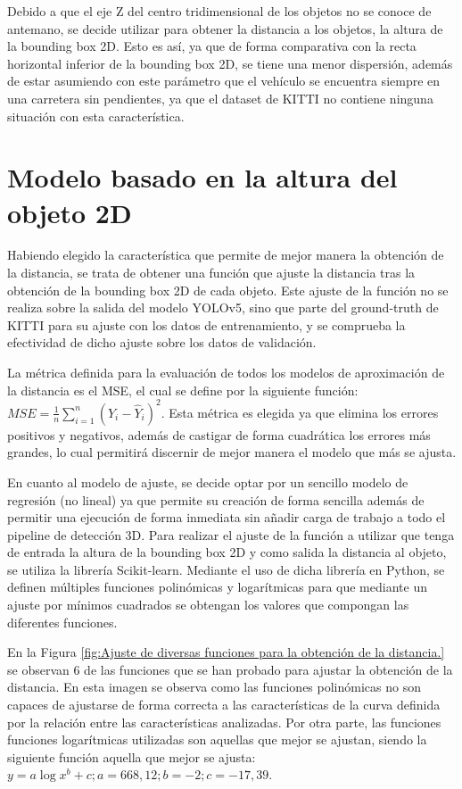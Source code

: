Debido a que el eje Z del centro tridimensional de los objetos no se conoce de antemano, se decide utilizar para obtener la distancia a los objetos, la altura de la bounding box 2D. Esto es así, ya que de forma comparativa con la recta horizontal inferior de la bounding box 2D, se tiene una menor dispersión, además de estar asumiendo con este parámetro que el vehículo se encuentra siempre en una carretera sin pendientes, ya que el dataset de KITTI no contiene ninguna situación con esta característica.

\section{Modelo basado en la altura del objeto 2D}
\label{sec:Modelo basado en la altura del objeto 2D}

Habiendo elegido la característica que permite de mejor manera la obtención de la distancia, se trata de obtener una función que ajuste la distancia tras la obtención de la bounding box 2D de cada objeto. Este ajuste de la función no se realiza sobre la salida del modelo \ac{YOLO}v5, sino que parte del ground-truth de KITTI para su ajuste con los datos de entrenamiento, y se comprueba la efectividad de dicho ajuste sobre los datos de validación.

La métrica definida para la evaluación de todos los modelos de aproximación de la distancia es el \ac{MSE}, el cual se define por la siguiente función: $\textit{MSE} = \frac{1}{n} \sum_{i=1}^{n} (Y_i - \hat{Y}_i)^2$. Esta métrica es elegida ya que elimina los errores positivos y negativos, además de castigar de forma cuadrática los errores más grandes, lo cual permitirá discernir de mejor manera el modelo que más se ajusta.

En cuanto al modelo de ajuste, se decide optar por un sencillo modelo de regresión (no lineal) ya que permite su creación de forma sencilla además de permitir una ejecución de forma inmediata sin añadir carga de trabajo a todo el pipeline de detección 3D. Para realizar el ajuste de la función a utilizar que tenga de entrada la altura de la bounding box 2D y como salida la distancia al objeto, se utiliza la librería Scikit-learn. Mediante el uso de dicha librería en Python, se definen múltiples funciones polinómicas y logarítmicas para que mediante un ajuste por mínimos cuadrados se obtengan los valores que compongan las diferentes funciones.

En la Figura \ref{fig:Ajuste de diversas funciones para la obtención de la distancia.} se observan 6 de las funciones que se han probado para ajustar la obtención de la distancia. En esta imagen se observa como las funciones polinómicas no son capaces de ajustarse de forma correcta a las características de la curva definida por la relación entre las características analizadas. Por otra parte, las funciones funciones logarítmicas utilizadas son aquellas que mejor se ajustan, siendo la siguiente función aquella que mejor se ajusta: $y = a \log{x}^b + c; a = 668,12; b = -2; c = -17,39$.

